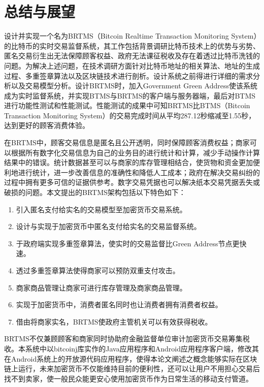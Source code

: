    
\chapter{总结与展望}
设计并实现一个名为BRTMS（Bitcoin Realtime Transaction Monitoring System）的比特币的实时交易监督系统，其工作包括背景调研比特币技术上的优势与劣势、匿名交易衍生出无法保障顾客权益、政府无法课征税收及存在着透过比特币洗钱的问题。为解决上述问题，在技术调研方面针对比特币地址的相关算法、地址的生成过程、多重签章算法以及区块链技术进行剖析。设计系统之前得进行详细的需求分析以及交易模型分析。设计BRTMS时，加入Government Green Address使该系统成为实时监督系统，并实现BTMS与BRTMS的客户端与服务器端，最后对BTMS进行功能性测试和性能测试。性能测试的成果中可知BRTMS比BTMS（Bitcoin Transaction Monitoring System）的交易完成时间从平均287.12秒缩减至1.55秒，达到更好的顾客消费体验。

在BRTMS中，顾客交易信息是匿名且公开透明，同时保障顾客消费权益；商家可以根据所有数字化交易信息为自己的业务目的进行统计和计算，减少手动操作计算结果中的错误。统计数据甚至可以与商家的库存管理相结合，使货物和资金更加便利地进行统计，进一步改善信息的准确性和降低人工成本；政府在解决交易纠纷的过程中拥有更多可信的证据供参考。数字交易凭据也可以解决纸本交易凭据丢失或破损的问题。本文提出的BRTMS架构包括以下特色如下：
		\begin{enumerate}
			\item 引入匿名支付给实名的交易模型至加密货币交易系统。
			\item 设计与实现于加密货币中匿名支付给实名的交易监督系统。
			\item 于政府端实现多重签章算法，使实时的交易监督比Green Address节点更快速。
			\item 透过多重签章算法使得商家可以预防双重支付攻击。
			\item 商家商品管理让商家可进行库存管理及商家商品管理。
			\item 实现于加密货币中，消费者匿名同时也让消费者拥有消费者权益。
			\item 借由将商家实名，BRTMS使政府主管机关可以有效获得税收。
		\end{enumerate}



		
BRTMS不仅兼顾顾客和商家同时协助府金融监督单位审计加密货币交易筹集税收。本系统中以bitcoinj库实作的Java应用程序和Android应用程序客户端，修改其在Android系统上的开放源代码应用程序，使得本论文阐述之概念能够实际在区块链上运行，未来加密货币不仅能维持目前的便利性，还可以让用户不用担心交易后找不到卖家，使一般民众能更安心使用加密货币作为日常生活的移动支付管道。
